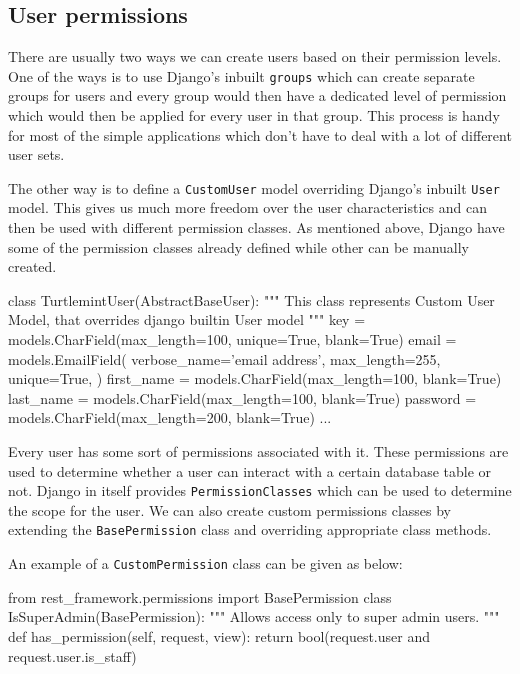 \subsection{User permissions}
There are usually two ways we can create users based on their permission
levels. One of the ways is to use Django's inbuilt \texttt{groups} which can
create separate groups for users and every group would then have a dedicated
level of permission which would then be applied for every user in that group.
This process is handy for most of the simple applications which don't have
to deal with a lot of different user sets.

The other way is to define a \texttt{CustomUser} model overriding Django's
inbuilt \texttt{User} model. This gives us much more freedom over the user
characteristics and can then be used with different permission classes. As
mentioned above, Django have some of the permission classes already defined
while other can be manually created.

\begin{pythoncode}
class TurtlemintUser(AbstractBaseUser):
    """
    This class represents Custom User Model,
    that overrides django builtin User model
    """
    key = models.CharField(max_length=100, unique=True, blank=True)
    email = models.EmailField(
        verbose_name='email address',
        max_length=255,
        unique=True,
    )
    first_name = models.CharField(max_length=100, blank=True)
    last_name = models.CharField(max_length=100, blank=True)
    password = models.CharField(max_length=200, blank=True)
    ...
\end{pythoncode}

Every user has some sort of permissions associated with it. These permissions
are used to determine whether a user can interact with a certain database table
or not. Django in itself provides \texttt{PermissionClasses} which can be used
to determine the scope for the user. We can also create custom permissions
classes by extending the \texttt{BasePermission} class and overriding
appropriate class methods.

An example of a \texttt{CustomPermission} class can be given as below:
\begin{pythoncode}
from rest_framework.permissions import BasePermission
class IsSuperAdmin(BasePermission):
    """
    Allows access only to super admin users.
    """
    def has_permission(self, request, view):
        return bool(request.user and request.user.is_staff)
\end{pythoncode}

